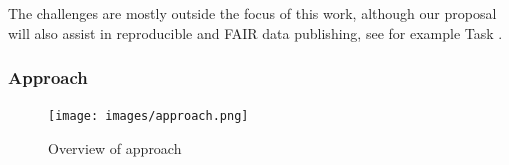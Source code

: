 The  challenges are mostly outside the focus of this work,
although our proposal will also assist in reproducible and FAIR data
publishing, see for example Task .





\subsubsection{Approach}\label{sec:methodology}

\begin{figure}[htb]
  \centerline{
    \texttt{[image: images/approach.png]}
    }
  \caption{Overview of \TheProject approach} \label{fig:overview-approach}
\end{figure}

